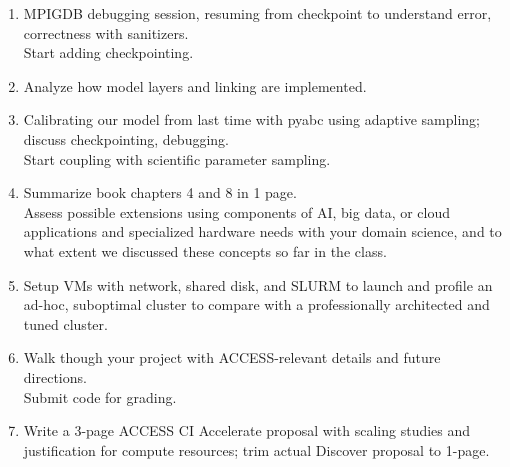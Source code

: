 \documentclass{article}
\begin{document}
\begin{tcbposter}
{\begin{multicols}{2}
\begin{enumerate}
        Document, package with Spack or Apptainer.%
      \item \textcolor{blue!80!black}{\faKeyboardO{}}
        MPIGDB debugging session, resuming from
        checkpoint
        to understand error, correctness with sanitizers.\@\\
        \textcolor{blue!80!black}{\faWrench{}}
        Start adding checkpointing.%
      \item \textcolor{green!50!black}{\faKeyboardO{}}
        Analyze how model layers and linking are
        implemented\supercite{cilfone_2015}.%
      \item \textcolor{green!50!black}{\faKeyboardO{}}
        Calibrating our model from last time with
        pyabc using adaptive sampling; discuss
        checkpointing, debugging.\\
        \textcolor{green!50!black}{\faWrench{}}
        Start coupling with scientific parameter sampling.%
      \item \textcolor{green!50!black}{\faSuitcase{}}
        Summarize book\supercite{zbakh_2024} chapters 4
        and 8 in 1 page.\\
        \textcolor{green!50!black}{\faWrench{}}
        Assess possible extensions using components of AI, big data, or
        cloud applications and specialized hardware needs with your
        domain science, and to what extent we discussed these concepts
        so far in the class.%
      \item \textcolor{black!60}{\faKeyboardO{}}
        Setup VMs with network, shared disk, and
        SLURM to launch and profile an ad-hoc, suboptimal cluster
        to compare with a professionally architected and tuned cluster.%
      \item \textcolor{red!80!black}{\faKeyboardO{}}
        Walk though your project with
        ACCESS-relevant details and future directions.\\
        \textcolor{red!80!black}{\faWrench{}} Submit code for grading.%
      \item \textcolor{red!80!black}{\faWrench{}}
        Write a 3-page ACCESS CI
        Accelerate proposal with scaling studies and justification for
        compute resources; trim actual Discover proposal to
        1-page.%
      \end{enumerate}
    \end{multicols}
  }


\end{tcbposter}
\end{document}
